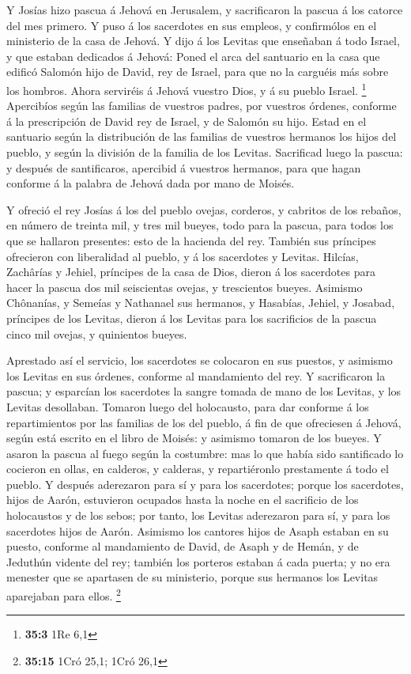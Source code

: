 Y Josías hizo pascua á Jehová en Jerusalem, y
sacrificaron la pascua á los catorce del mes primero.  Y
puso á los sacerdotes en sus empleos, y confirmólos en el ministerio de
la casa de Jehová.  Y dijo á los Levitas que enseñaban á
todo Israel, y que estaban dedicados á Jehová: Poned el arca del
santuario en la casa que edificó Salomón hijo de David, rey de Israel,
para que no la carguéis más sobre los hombros. Ahora serviréis á Jehová
vuestro Dios, y á su pueblo Israel. \footnote{\textbf{35:3} 1Re 6,1}
 Apercibíos según las familias de vuestros padres, por
vuestros órdenes, conforme á la prescripción de David rey de Israel, y
de Salomón su hijo.  Estad en el santuario según la
distribución de las familias de vuestros hermanos los hijos del pueblo,
y según la división de la familia de los Levitas. 
Sacrificad luego la pascua: y después de santificaros, apercibid á
vuestros hermanos, para que hagan conforme á la palabra de Jehová dada
por mano de Moisés.

 Y ofreció el rey Josías á los del pueblo ovejas,
corderos, y cabritos de los rebaños, en número de treinta mil, y tres
mil bueyes, todo para la pascua, para todos los que se hallaron
presentes: esto de la hacienda del rey.  También sus
príncipes ofrecieron con liberalidad al pueblo, y á los sacerdotes y
Levitas. Hilcías, Zachârías y Jehiel, príncipes de la casa de Dios,
dieron á los sacerdotes para hacer la pascua dos mil seiscientas ovejas,
y trescientos bueyes.  Asimismo Chônanías, y Semeías y
Nathanael sus hermanos, y Hasabías, Jehiel, y Josabad, príncipes de los
Levitas, dieron á los Levitas para los sacrificios de la pascua cinco
mil ovejas, y quinientos bueyes.

 Aprestado así el servicio, los sacerdotes se colocaron
en sus puestos, y asimismo los Levitas en sus órdenes, conforme al
mandamiento del rey.  Y sacrificaron la pascua; y
esparcían los sacerdotes la sangre tomada de mano de los Levitas, y los
Levitas desollaban.  Tomaron luego del holocausto, para
dar conforme á los repartimientos por las familias de los del pueblo, á
fin de que ofreciesen á Jehová, según está escrito en el libro de
Moisés: y asimismo tomaron de los bueyes.  Y asaron la
pascua al fuego según la costumbre: mas lo que había sido santificado lo
cocieron en ollas, en calderos, y calderas, y repartiéronlo prestamente
á todo el pueblo.  Y después aderezaron para sí y para
los sacerdotes; porque los sacerdotes, hijos de Aarón, estuvieron
ocupados hasta la noche en el sacrificio de los holocaustos y de los
sebos; por tanto, los Levitas aderezaron para sí, y para los sacerdotes
hijos de Aarón.  Asimismo los cantores hijos de Asaph
estaban en su puesto, conforme al mandamiento de David, de Asaph y de
Hemán, y de Jeduthún vidente del rey; también los porteros estaban á
cada puerta; y no era menester que se apartasen de su ministerio, porque
sus hermanos los Levitas aparejaban para ellos. \footnote{\textbf{35:15}
  1Cró 25,1; 1Cró 26,1}

